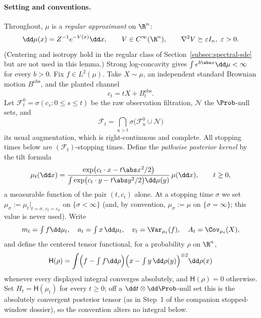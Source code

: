 \documentclass[../main.tex]{subfiles}
\begin{document}
\paragraph{Setting and conventions.}
Throughout, $\mu$ is a \emph{regular approximant} on $\R^n$:
\[
  \dd\mu(x)=Z^{-1}e^{-V(x)}\dd x,
  \qquad V\in C^\infty(\R^n),\qquad \nabla^2V\succeq\varepsilon I_n,\ \varepsilon>0 .
\]
(Centering and isotropy hold in the regular class of
Section~\ref{subsec:spectral-sde} but are not used in this lemma.)  Strong
log-concavity gives $\int e^{b\abs x}\dd\mu<\infty$ for every $b>0$.  Fix
$f\in L^2(\mu)$.  Take $X\sim\mu$, an independent standard Brownian motion
$B^{\mathrm{obs}}$, and the planted channel
\[
  c_t=tX+B_t^{\mathrm{obs}} .
\]
Let $\mathcal F^0_t=\sigma(c_s:0\le s\le t)$ be the raw observation filtration,
$\mathcal N$ the $\Prob$-null sets, and
\[
  \mathcal F_t=\bigcap_{u>t}\sigma\bigl(\mathcal F^0_u\cup\mathcal N\bigr)
\]
its usual augmentation, which is right-continuous and complete.  All stopping times
below are $(\mathcal F_t)$-stopping times.  Define the \emph{pathwise posterior kernel}
by the tilt formula
\begin{equation}
  \mu_t(\dd x)
  =\frac{\exp\bigl(c_t\cdot x-t\abs x^2/2\bigr)}
        {\int\exp\bigl(c_t\cdot y-t\abs y^2/2\bigr)\dd\mu(y)}\,\mu(\dd x),
  \qquad t\ge0,
  \label{eq:sol-rdw-kernel}
\end{equation}
a measurable function of the pair $(t,c_t)$ alone.  At a stopping time $\sigma$ we set
$\mu_\sigma:=\mu_t|_{t=\sigma,\,c_t=c_\sigma}$ on $\{\sigma<\infty\}$ (and, by
convention, $\mu_\sigma:=\mu$ on $\{\sigma=\infty\}$; this value is never used).  Write
\[
  m_t=\textstyle\int f\dd\mu_t,\quad
  a_t=\int x\,\dd\mu_t,\quad
  v_t=\Var_{\mu_t}(f),\quad
  A_t=\Cov_{\mu_t}(X),
\]
and define the centered tensor functional, for a probability $\rho$ on $\R^n$,
\[
  \mathsf H(\rho)
  =\int\Bigl(f-\textstyle\int f\dd\rho\Bigr)
   \Bigl(x-\textstyle\int y\,\dd\rho(y)\Bigr)^{\otimes2}\dd\rho(x)
\]
whenever every displayed integral converges absolutely, and $\mathsf H(\rho)=0$
otherwise.  Set $H_t=\mathsf H(\mu_t)$ for every $t\ge0$; off a
$\dd t\otimes\dd\Prob$-null set this is the absolutely convergent posterior tensor (as
in Step~1 of the companion stopped-window dossier), so the convention alters no
integral below.
\end{document}

